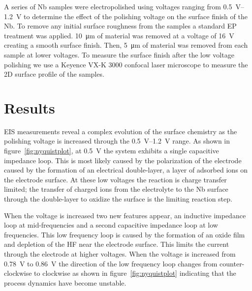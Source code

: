 A series of Nb samples were electropolished using voltages ranging from \qtyrange{0.5}{1.2}{\volt} to determine the effect of the polishing voltage on the surface finish of the Nb. To remove any initial surface roughness from the samples a standard EP treatment was applied. \qty{10}{\micro\meter} of material was removed at a voltage of \qty{16}{\volt} creating a smooth surface finish. Then, \qty{5}{\micro\meter} of material was removed from each sample at lower voltages. To measure the surface finish after the low voltage polishing we use a Keyence VX-K 3000 confocal laser microscope to measure the 2D surface profile of the samples.



\section{Results}
\label{sec:results}

EIS measurements reveal a complex evolution of the surface chemistry as the polishing voltage is increased through the \qtyrange{0.5}{1.2}{\volt} range. As shown in figure~\ref{fig:nyquistplot}, at \qty{0.5}{\volt} the system exhibits a single capacitive impedance loop. This is most likely caused by the polarization of the electrode caused by the formation of an electrical double-layer, a layer of adsorbed ions on the electrode surface.\cite{eliaz2018physical} At these low voltages the reaction is charge transfer limited; the transfer of charged ions from the electrolyte to the Nb surface through the double-layer to oxidize the surface is the limiting reaction step.

When the voltage is increased two new features appear, an inductive impedance loop at mid-frequencies and a second capacitive impedance loop at low frequencies. This low frequency loop is caused by the formation of an oxide film and depletion of the HF near the electrode surface. This limits the current through the electrode at higher voltages. When the voltage is increased from \qty{0.78}{\volt} to \qty{0.86}{\volt} the direction of the low frequency loop changes from counter-clockwise to clockwise as shown in figure~\ref{fig:nyquistplot} indicating that the process dynamics have become unstable.


